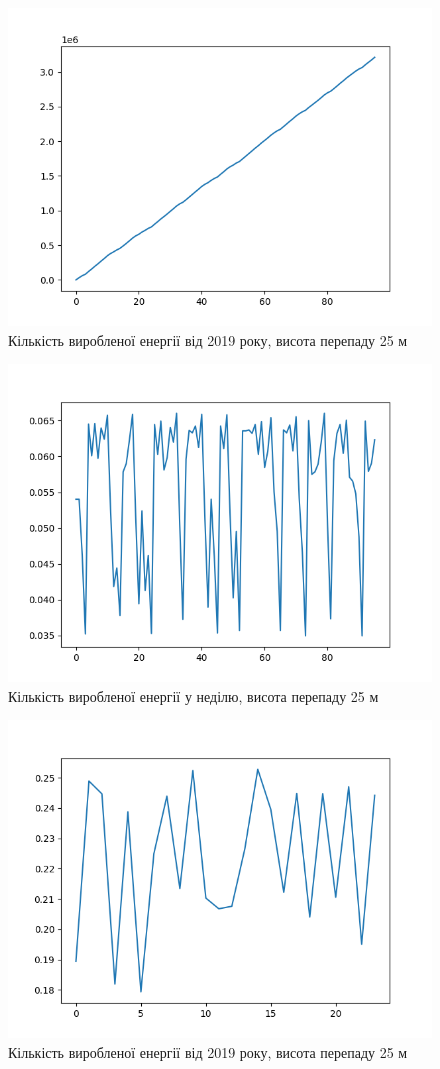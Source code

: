 \documentclass[12pt]{article}
\numberwithin{equation}{section}
\numberwithin{figure}{section}
\begin{document}
\begin{figure}[!htb]
	\centering
	\includegraphics[width=0.7\linewidth]{Figure_25_3.png}
	\caption{Кількість виробленої енергії від 2019 року, висота перепаду 25 м}\label{fig:25_3}
\end{figure}
\begin{figure}[!htb]
	\centering
	\includegraphics[width=0.7\linewidth]{Figure_25_4.png}
	\caption{Кількість виробленої енергії у неділю, висота перепаду 25 м}\label{fig:25_4}
\end{figure}
\begin{figure}[!htb]
	\centering
	\includegraphics[width=0.7\linewidth]{Figure_25_5.png}
	\caption{Кількість виробленої енергії від 2019 року, висота перепаду 25 м}\label{fig:25_5}
\end{figure}
\end{document}

